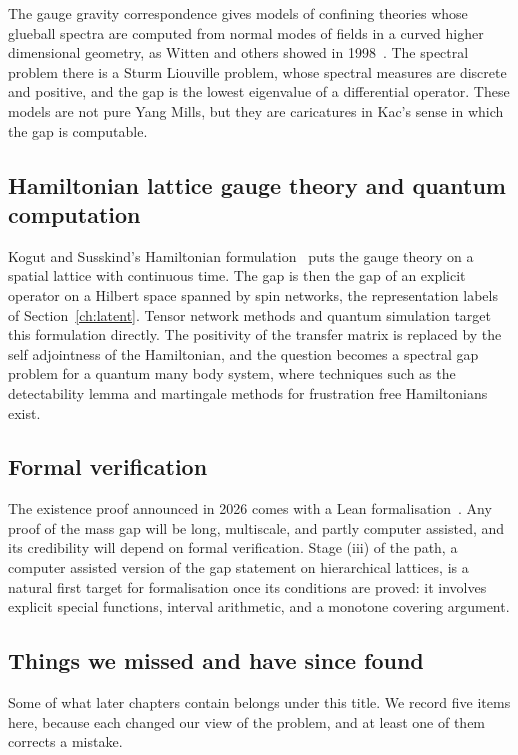 The gauge gravity correspondence gives models of confining theories whose glueball spectra are computed from normal modes of fields in a curved higher dimensional geometry, as Witten and others showed in 1998~\cite{Wi98}. The spectral problem there is a Sturm Liouville problem, whose spectral measures are discrete and positive, and the gap is the lowest eigenvalue of a differential operator. These models are not pure Yang Mills, but they are caricatures in Kac's sense in which the gap is computable.

\subsection{Hamiltonian lattice gauge theory and quantum computation}

Kogut and Susskind's Hamiltonian formulation~\cite{KS75} puts the gauge theory on a spatial lattice with continuous time. The gap is then the gap of an explicit operator on a Hilbert space spanned by spin networks, the representation labels of Section~\ref{ch:latent}. Tensor network methods and quantum simulation target this formulation directly. The positivity of the transfer matrix is replaced by the self adjointness of the Hamiltonian, and the question becomes a spectral gap problem for a quantum many body system, where techniques such as the detectability lemma and martingale methods for frustration free Hamiltonians exist.

\subsection{Formal verification}

The existence proof announced in 2026 comes with a Lean formalisation~\cite{OAI}. Any proof of the mass gap will be long, multiscale, and partly computer assisted, and its credibility will depend on formal verification. Stage (iii) of the path, a computer assisted version of the gap statement on hierarchical lattices, is a natural first target for formalisation once its conditions are proved: it involves explicit special functions, interval arithmetic, and a monotone covering argument.

\subsection{Things we missed and have since found}

Some of what later chapters contain belongs under this title. We record five items here, because each changed our view of the problem, and at least one of them corrects a mistake.

